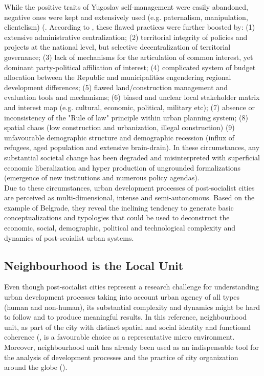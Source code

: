 \documentclass[11pt]{report}
\begin{document}
While the positive traits of Yugoslav self-management were easily abandoned, negative ones were kept and extensively used (e.g. paternalism, manipulation, clientelism) (\href{Vujosevic}{\citealt{vujosevic_conundrum_2012}}.
According to \href{Vujosevic}{\citealt{vujosevic_regionalizam_2015}}, these flawed practices were further boosted by:
(1) extensive administrative centralization;
(2) territorial integrity of policies and projects at the national level, but selective decentralization of territorial governance;
(3) lack of mechanisms for the articulation of common interest, yet dominant party-political affiliation of interest;
(4) complicated system of budget allocation between the Republic and municipalities engendering regional development differences;
(5) flawed land/construction management and evaluation tools and mechanisms;
(6) biased and unclear local stakeholder matrix and interest map (e.g. cultural, economic, political, military etc);
(7) absence or inconsistency of the "Rule of law" principle within urban planning system;
(8) spatial chaos (low construction and urbanization, illegal construction)
(9) unfavourable demographic structure and demographic recession (influx of refugees, aged population and extensive brain-drain).
In these circumstances, any substantial societal change has been  degraded  and  misinterpreted  with  superficial  economic  liberalization  and  hyper  production  of ungrounded formalizations (emergence of new institutions and numerous policy agendas). 
\\

Due to these circumstances, urban development processes of post-socialist cities are perceived as multi-dimensional, intense and semi-autonomous.
Based on the example of Belgrade, they reveal the inclining tendency to generate basic conceptualizations and typologies that could be used to deconstruct the economic, social, demographic, political and technological complexity and dynamics of post-scoialist urban systems.
  
\subsection{Neighbourhood is the Local Unit}

Even though post-socialist cities represent a research challenge for understanding urban development processes taking into account urban agency of all types (human and non-human), its substantial complexity and dynamics might be hard to follow and to produce meaningful results.
In this reference, neighbourhood unit, as part of the city with distinct spatial and social identity and functional coherence (\href{Merlin}{\citealt{choay_dictionnaire_2010}}, is a favourable choice as a representative micro environment.
Moreover, neighbourhood unit has already been used as an indispensable tool for the analysis of development processes and the practice of city organization around the globe (\href{Meenakshi}{\citealt{meenakshi_neighborhood_2011}}).
\\
\end{document}
